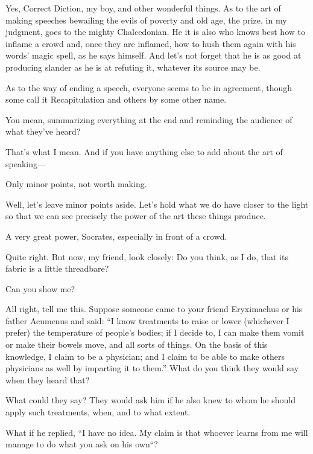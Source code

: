 \saysocrates Yes, Correct Diction, my boy, and other wonderful things. As
to the art of making speeches bewailing the evils of poverty and old
age, the prize, in my judgment, goes to the mighty
Chalcedonian. He it is
also who knows best how to inflame a crowd and, once they are
inflamed, how to hush them again with his words' magic spell, as he says
himself. And let's not forget that he is as good at producing slander as
he is at refuting it, whatever its source may be.

As to the way of ending a speech, everyone seems to be in agreement,
though some call it Recapitulation and others by some other name.

\sayphaedrus You mean, summarizing everything at the end and reminding the
audience of what they've heard?

\saysocrates That's what I mean. And if you have anything else to add about
the art of speaking---

\sayphaedrus Only minor points, not worth making.

\saysocrates Well, let's leave minor points aside. Let's
hold what we do have closer to the light so that we can see precisely
the power of the art these things produce.

\sayphaedrus A very great power, Socrates, especially in front of a crowd.

\saysocrates Quite right. But now, my friend, look closely: Do you think,
as I do, that its fabric is a little threadbare?

\sayphaedrus Can you show me?

\saysocrates All right, tell me this. Suppose someone came to your friend
Eryximachus or his father Acumenus and said: “I know treatments to raise
or lower (whichever I prefer) the temperature of people's bodies; if I
decide to, I can make them vomit or make their bowels move, and
all sorts of things. On the basis of this knowledge, I claim to be a
physician; and I claim to be able to make others physicians as well by
imparting it to them.” What do you think they would say when they heard
that?

\sayphaedrus What could they say? They would ask him if he also knew to
whom he should apply such treatments, when, and to what extent.

\saysocrates What if he replied, “I have no idea. My claim is that whoever
learns from me will manage to do what you ask on his own“?

